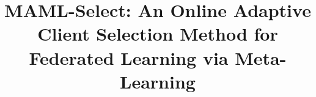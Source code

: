 \documentclass[journal]{IEEEtran}
\begin{document}
\title{MAML-Select: An Online Adaptive Client Selection Method for Federated Learning via Meta-Learning}


\maketitle

\end{document}
